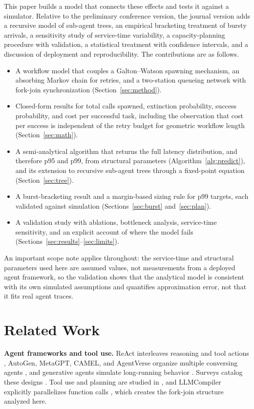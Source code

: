 \documentclass[journal]{IEEEtran}
\begin{document}
This paper builds a model that connects these effects and tests it against a simulator. Relative to the preliminary conference version, the journal version adds a recursive model of sub-agent trees, an empirical bracketing treatment of bursty arrivals, a sensitivity study of service-time variability, a capacity-planning procedure with validation, a statistical treatment with confidence intervals, and a discussion of deployment and reproducibility. The contributions are as follows.
\begin{itemize}
\item A workflow model that couples a Galton--Watson spawning mechanism, an absorbing Markov chain for retries, and a two-station queueing network with fork-join synchronization (Section~\ref{sec:method}).
\item Closed-form results for total calls spawned, extinction probability, success probability, and cost per successful task, including the observation that cost per success is independent of the retry budget for geometric workflow length (Section~\ref{sec:math}).
\item A semi-analytical algorithm that returns the full latency distribution, and therefore p95 and p99, from structural parameters (Algorithm~\ref{alg:predict}), and its extension to recursive sub-agent trees through a fixed-point equation (Section~\ref{sec:tree}).
\item A burst-bracketing result and a margin-based sizing rule for p99 targets, each validated against simulation (Sections~\ref{sec:burst} and~\ref{sec:plan}).
\item A validation study with ablations, bottleneck analysis, service-time sensitivity, and an explicit account of where the model fails (Sections~\ref{sec:results}--\ref{sec:limits}).
\end{itemize}
An important scope note applies throughout: the service-time and structural parameters used here are assumed values, not measurements from a deployed agent framework, so the validation shows that the analytical model is consistent with its own simulated assumptions and quantifies approximation error, not that it fits real agent traces.

\section{Related Work}
\textbf{Agent frameworks and tool use.} ReAct interleaves reasoning and tool actions \cite{yao2023react}, AutoGen, MetaGPT, CAMEL, and AgentVerse organize multiple conversing agents \cite{wu2023autogen,hong2024metagpt,li2023camel,chen2024agentverse}, and generative agents simulate long-running behavior \cite{park2023generative}. Surveys catalog these designs \cite{wang2024survey}. Tool use and planning are studied in \cite{schick2023toolformer,shinn2023reflexion,wei2022cot}, and LLMCompiler explicitly parallelizes function calls \cite{kim2024llmcompiler}, which creates the fork-join structure analyzed here.
\end{document}
